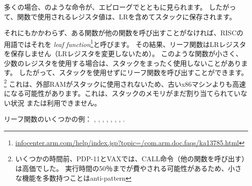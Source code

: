 多くの場合、のような命令が、エピローグでとともに見られます。
したがって、関数で使用されるレジスタ値は、\ac{LR}を含めてスタックに保存されます。

それにもかかわらず、ある関数が他の関数を呼び出すことがなければ、\ac{RISC}の用語ではそれを
\emph{\gls{leaf function}}\footnote{\href{http://infocenter.arm.com/help/index.jsp?topic=/com.arm.doc.faqs/ka13785.html}{infocenter.arm.com/help/index.jsp?topic=/com.arm.doc.faqs/ka13785.html}}と呼びます。
その結果、リーフ関数は\ac{LR}レジスタを保存しません（\ac{LR}レジスタを変更しないため）。 
このような関数が小さく、少数のレジスタを使用する場合は、スタックをまったく使用しないことがあります。 
したがって、スタックを使用せずにリーフ関数を呼び出すことができます。
\footnote{いくつかの時間前、PDP-11とVAXでは、CALL命令（他の関数を呼び出す）は高価でした。 
実行時間の50％までが費やされる可能性があるため、小さな機能を多数持つことは\gls{anti-pattern} }
これは、外部RAMがスタックに使用されないため、古いx86マシンよりも高速になる可能性があります。これは、スタックのメモリがまだ割り当てられていない状況 または利用できません。

リーフ関数のいくつかの例：
, , 
, , ,
, , .
